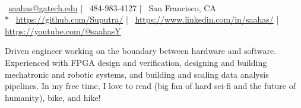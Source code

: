 \documentclass[]{awesome-cv}
\begin{document}
    
\begin{center}
	  \\
	\vspace{1pt}
	{\faEnvelope\ \href{mailto:saahas.yechuri@gatech.edu}{saahas@gatech.edu}} | {\faMobile\ 484-983-4127} | {\faMapMarker\ San Francisco, CA} 
	\\* {\faGithub\ \url{https://github.com/Suputra/}} | {\faLinkedin\ \url{https://www.linkedin.com/in/saahas/} | \url{https://youtube.com/@saahasY}}
	
\end{center}

Driven engineer working on the boundary between hardware and software. Experienced with FPGA design and verification, designing and building mechatronic and robotic systems, and building and scaling data analysis pipelines. In my free time, I love to read (big fan of hard sci-fi and the future of humanity), bike, and hike!
\end{document}
